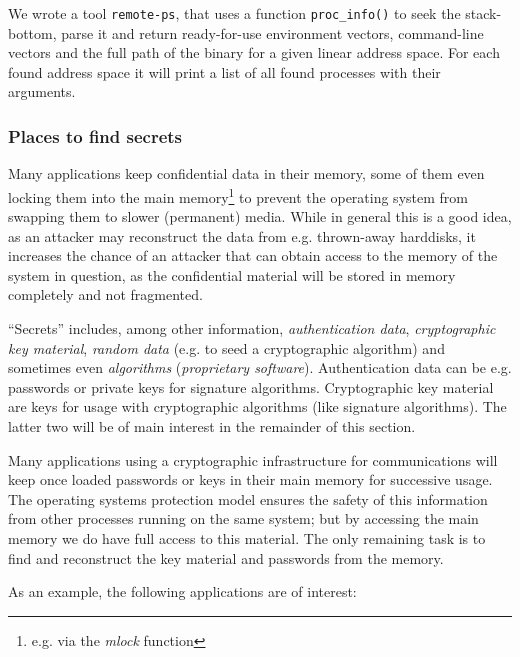 We wrote a tool \texttt{remote-ps}, that uses a function \texttt{proc\_info()}
to seek the stack-bottom, parse it and return ready-for-use environment vectors,
command-line vectors and the full path of the binary for a given linear address
space.  For each found address space it will print a list of all found processes
with their arguments.

\subsubsection{Places to find secrets}

Many applications keep confidential data in their memory, some of them even
locking them into the main memory\footnote{e.g\@. via the \emph{mlock} function}
to prevent the operating system from swapping them to slower (permanent) media.
While in general this is a good idea, as an attacker may reconstruct the data
from e.g\@. thrown-away harddisks, it increases the chance of an attacker that
can obtain access to the memory of the system in question, as the confidential
material will be stored in memory completely and not fragmented.

``Secrets'' includes, among other information, \emph{authentication data},
\emph{cryptographic key material}, \emph{random data} (e.g\@. to seed a
cryptographic algorithm) and sometimes even \emph{algorithms} (\emph{proprietary
software}). Authentication data can be e.g\@. passwords or private keys for
signature algorithms. Cryptographic key material are keys for usage with
cryptographic algorithms (like signature algorithms). The latter two will be of
main interest in the remainder of this section.

Many applications using a cryptographic infrastructure for communications will
keep once loaded passwords or keys in their main memory for successive usage.
The operating systems protection model ensures the safety of this information
from other processes running on the same system; but by accessing the main
memory we do have full access to this material. The only remaining task is to
find and reconstruct the key material and passwords from the memory.

As an example, the following applications are of interest:

